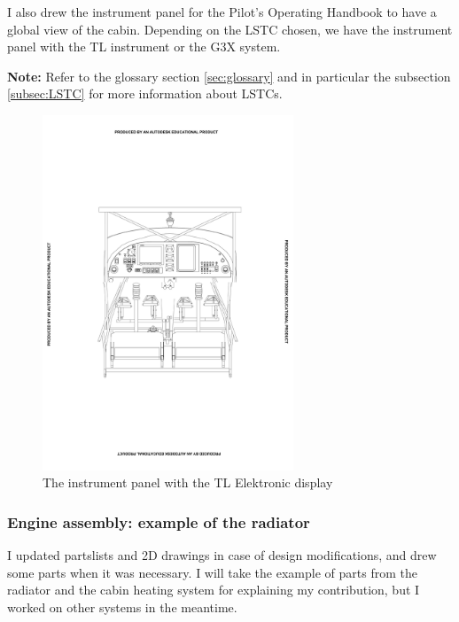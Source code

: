 \documentclass[11pt,a4paper]{article}
\begin{document}
\newpage

I also drew the instrument panel for the Pilot's Operating Handbook to have a global view of the cabin. Depending on the LSTC chosen, we have the instrument panel with the TL instrument or the G3X system.

\bigskip

\textbf{Note:} Refer to the glossary section \ref{sec:glossary} and in particular the subsection \ref{subsec:LSTC} for more information about LSTCs.

\begin{figure}[ht!]
	\begin{center}
		\includegraphics[width=7.5cm,trim = 5cm 10cm 5cm 10cm, clip]{pics/PIC006.pdf}
		\caption{The instrument panel with the TL Elektronic display}
		\label{fig:PIC006}
	\end{center}
\end{figure}

\newpage

\subsubsection{Engine assembly: example of the radiator}

I updated partslists and 2D drawings in case of design modifications, and drew some parts when it was necessary. I will take the example of parts from the radiator and the cabin heating system for explaining my contribution, but I worked on other systems in the meantime.
\end{document}
